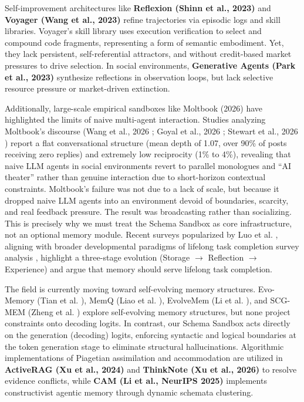 \documentclass[10pt,journal,compsoc]{IEEEtran}
\begin{document}
Self-improvement architectures like \textbf{Reflexion (Shinn et al., 2023)} \cite{shinn2023} and \textbf{Voyager (Wang et al., 2023)} \cite{wang2023} refine trajectories via episodic logs and skill libraries. Voyager's skill library uses execution verification to select and compound code fragments, representing a form of semantic embodiment. Yet, they lack persistent, self-referential attractors, and without credit-based market pressures to drive selection. In social environments, \textbf{Generative Agents (Park et al., 2023)} \cite{park2023} synthesize reflections in observation loops, but lack selective resource pressure or market-driven extinction. 

Additionally, large-scale empirical sandboxes like Moltbook (2026) have highlighted the limits of naive multi-agent interaction. Studies analyzing Moltbook's discourse (Wang et al., 2026 \cite{moltbook_discoursev1}; Goyal et al., 2026 \cite{moltbook_constraintsv1}; Stewart et al., 2026 \cite{moltbook_snav1}) report a flat conversational structure (mean depth of 1.07, over 90\% of posts receiving zero replies) and extremely low reciprocity (1\% to 4\%), revealing that naive LLM agents in social environments revert to parallel monologues and ``AI theater'' rather than genuine interaction due to short-horizon contextual constraints. Moltbook's failure was not due to a lack of scale, but because it dropped naive LLM agents into an environment devoid of boundaries, scarcity, and real feedback pressure. The result was broadcasting rather than socializing. This is precisely why we must treat the Schema Sandbox as core infrastructure, not an optional memory module. Recent surveys popularized by Luo et al. \cite{luo2026}, aligning with broader developmental paradigms of lifelong task completion survey analysis \cite{zhang2024survey, pink2025}, highlight a three-stage evolution (Storage $\to$ Reflection $\to$ Experience) and argue that memory should serve lifelong task completion.

The field is currently moving toward self-evolving memory structures. Evo-Memory (Tian et al. \cite{evomemory2025v1}), MemQ (Liao et al. \cite{memq2026v1}), EvolveMem (Li et al. \cite{evolvemem2026v1}), and SCG-MEM (Zheng et al. \cite{zheng2026scgmemv1}) explore self-evolving memory structures, but none project constraints onto decoding logits. In contrast, our Schema Sandbox acts directly on the generation (decoding) logits, enforcing syntactic and logical boundaries at the token generation stage to eliminate structural hallucinations. Algorithmic implementations of Piagetian assimilation and accommodation are utilized in \textbf{ActiveRAG (Xu et al., 2024)} \cite{xu2024activeragv1} and \textbf{ThinkNote (Xu et al., 2026)} \cite{xu2026thinknote} to resolve evidence conflicts, while \textbf{CAM (Li et al., NeurIPS 2025)} \cite{li2025cam} implements constructivist agentic memory through dynamic schemata clustering.
\end{document}
